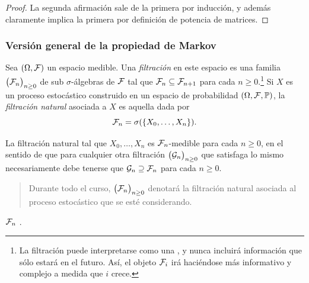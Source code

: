 \begin{proof}
La segunda afirmación sale de la primera por inducción, y además claramente implica la primera por definición de potencia de matrices.
\end{proof}

\subsubsection{Versión general de la propiedad de Markov}

\begin{defn}
Sea $(\Omega,\mathcal{F})$ un espacio medible.
Una \emph{filtración} en este espacio es una familia $\big(\mathcal{F}_n\big)_{n\geq0}$ de sub $\sigma$-álgebras de $\mathcal{F}$ tal que $\mathcal{F}_n\subseteq\mathcal{F}_{n+1}$ para cada $n\geq0$.\footnote{La filtración puede interpretarse como una , y nunca incluirá información que sólo estará en el futuro. Así, el objeto $\mathcal{F}_i$ irá haciéndose más informativo y complejo a medida que $i$ crece.}
\lsep
Si $X$ es un proceso estocástico construido en un espacio de probabilidad $(\Omega,\mathcal{F},\mathbb{P})$, la \emph{filtración natural} asociada a $X$ es aquella dada por
\[\mathcal{F}_n=\sigma(\{X_0,\dotsc,X_n\}).\]
\end{defn}

La filtración natural  tal que $X_0,\dotsc,X_n$ es $\mathcal{F}_n$-medible para cada $n\geq0$, en el sentido de que para cualquier otra filtración $\big(\mathcal{G}_n\big)_{n\geq0}$ que satisfaga lo mismo necesariamente debe tenerse que $\mathcal{G}_n\supseteq\mathcal{F}_n$ para cada $n\geq0$.
\begin{quote}
Durante todo el curso, $\big(\mathcal{F}_n\big)_{n\geq0}$ denotará la filtración natural asociada al proceso estocástico que se esté considerando.
\end{quote}
\lsep
$\mathcal{F}_n$ .

